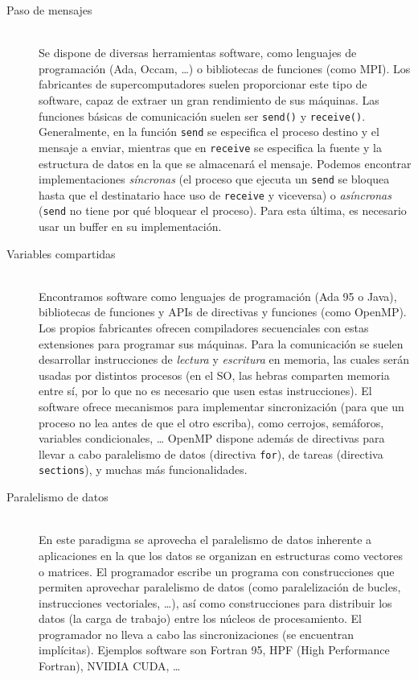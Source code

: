\begin{description}
    \item [Paso de mensajes]~\\
        Se dispone de diversas herramientas software, como lenguajes de programación (Ada, Occam, \ldots) o bibliotecas de funciones (como MPI). Los fabricantes de supercomputadores suelen proporcionar este tipo de software, capaz de extraer un gran rendimiento de sus máquinas. Las funciones básicas de comunicación suelen ser \verb|send()| y \verb|receive()|. Generalmente, en la función \verb|send| se especifica el proceso destino y el mensaje a enviar, mientras que en \verb|receive| se especifica la fuente y la estructura de datos en la que se almacenará el mensaje. Podemos encontrar implementaciones \emph{síncronas} (el proceso que ejecuta un \verb|send| se bloquea hasta que el destinatario hace uso de \verb|receive| y viceversa) o \emph{asíncronas} (\verb|send| no tiene por qué bloquear el proceso). Para esta última, es necesario usar un buffer en su implementación. 
    \item [Variables compartidas]~\\
        Encontramos software como lenguajes de programación (Ada 95 o Java), bibliotecas de funciones y APIs de directivas y funciones (como OpenMP). Los propios fabricantes ofrecen compiladores secuenciales con estas extensiones para programar sus máquinas. Para la comunicación se suelen desarrollar instrucciones de \emph{lectura} y \emph{escritura} en memoria, las cuales serán usadas por distintos procesos (en el SO, las hebras comparten memoria entre sí, por lo que no es necesario que usen estas instrucciones). El software ofrece mecanismos para implementar sincronización (para que un proceso no lea antes de que el otro escriba), como cerrojos, semáforos, variables condicionales, \ldots 
        OpenMP dispone además de directivas para llevar a cabo paralelismo de datos (directiva \verb|for|), de tareas (directiva \verb|sections|), y muchas más funcionalidades. 
    \item [Paralelismo de datos]~\\
        En este paradigma se aprovecha el paralelismo de datos inherente a aplicaciones en la que los datos se organizan en estructuras como vectores o matrices. El programador escribe un programa con construcciones que permiten aprovechar paralelismo de datos (como paralelización de bucles, instrucciones vectoriales, \ldots), así como construcciones para distribuir los datos (la carga de trabajo) entre los núcleos de procesamiento. El programador no lleva a cabo las sincronizaciones (se encuentran implícitas). Ejemplos software son Fortran 95, HPF (High Performance Fortran), NVIDIA CUDA, \ldots
\end{description}

